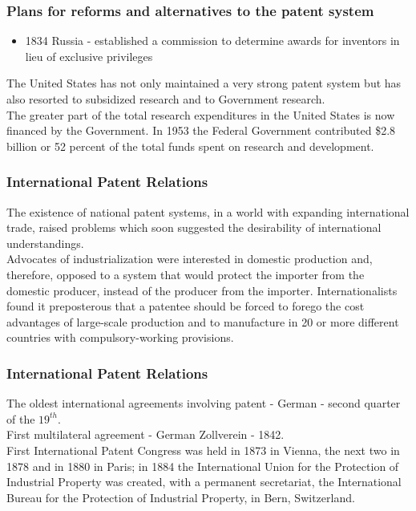 \begin{frame}
\frametitle{Plans for reforms and alternatives to the patent system}
\begin{itemize}
	\item 1834 Russia - established a commission to determine awards for inventors in lieu of exclusive privileges
\end{itemize}
The United States has not only maintained a very strong patent system but has also resorted to subsidized research and to Government research.\\
The greater part of the total research expenditures in the United States is now financed by the Government. In 1953 the Federal Government contributed \$2.8 billion or 52 percent of the total funds spent on research and development.
\end{frame}

\begin{frame}
\frametitle{International Patent Relations}
The existence of national patent systems, in a world with expanding international trade, raised problems which soon suggested the desirability of international understandings.\\
Advocates of industrialization were interested in domestic production and, therefore, opposed to a system that would protect the importer from the domestic producer, instead of the producer from the importer. Internationalists found it preposterous that a patentee should be forced to forego the cost advantages of large-scale production and to manufacture in 20 or more different countries with compulsory-working provisions.
\end{frame}

\begin{frame}
\frametitle{International Patent Relations}
The oldest international agreements involving patent - German - second quarter of the $19^{th}$.\\
First multilateral agreement - German Zollverein - 1842.\\
First International Patent Congress was held in 1873 in Vienna, the next two in 1878 and in 1880 in Paris; in 1884 the International Union for the Protection of Industrial Property was created, with a permanent secretariat, the International Bureau for the Protection of Industrial Property, in Bern, Switzerland.
\end{frame}

